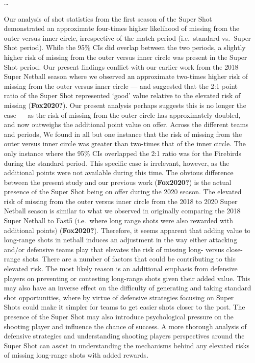 \documentclass[]{elsarticle} %
\begin{document}
\ldots{}

Our analysis of shot statistics from the first season of the Super Shot
demonstrated an approximate four-times higher likelihood of missing from
the outer versus inner circle, irrespective of the match period
(i.e.~standard vs.~Super Shot period). While the 95\% CIs did overlap
between the two periods, a slightly higher risk of missing from the
outer versus inner circle was present in the Super Shot period. Our
present findings conflict with our earlier work from the 2018 Super
Netball season where we observed an approximate two-times higher risk of
missing from the outer versus inner circle --- and suggested that the
2:1 point ratio of the Super Shot represented `good' value relative to
the elevated risk of missing (\textbf{Fox2020?}). Our present analysis
perhaps suggests this is no longer the case --- as the risk of missing
from the outer circle has approximately doubled, and now outweighs the
additional point value on offer. Across the different teams and periods,
We found in all but one instance that the risk of missing from the outer
versus inner circle was greater than two-times that of the inner circle.
The only instance where the 95\% CIs overlapped the 2:1 ratio was for
the Firebirds during the standard period. This specific case is
irrelevant, however, as the additional points were not available during
this time. The obvious difference between the present study and our
previous work (\textbf{Fox2020?}) is the actual presence of the Super
Shot being on offer during the 2020 season. The elevated risk of missing
from the outer versus inner circle from the 2018 to 2020 Super Netball
season is similar to what we observed in originally comparing the 2018
Super Netball to Fast5 (i.e.~where long range shots were also rewarded
with additional points) (\textbf{Fox2020?}). Therefore, it seems
apparent that adding value to long-range shots in netball induces an
adjustment in the way either attacking and/or defensive teams play that
elevates the risk of missing long- versus close-range shots. There are a
number of factors that could be contributing to this elevated risk. The
most likely reason is an additional emphasis from defensive players on
preventing or contesting long-range shots given their added value. This
may also have an inverse effect on the difficulty of generating and
taking standard shot opportunities, where by virtue of defensive
strategies focusing on Super Shots could make it simpler for teams to
get easier shots closer to the post. The presence of the Super Shot may
also introduce psychological pressure on the shooting player and
influence the chance of success. A more thorough analysis of defensive
strategies and understanding shooting players perspectives around the
Super Shot can assist in understanding the mechanisms behind any
elevated risks of missing long-range shots with added rewards.
\end{document}
